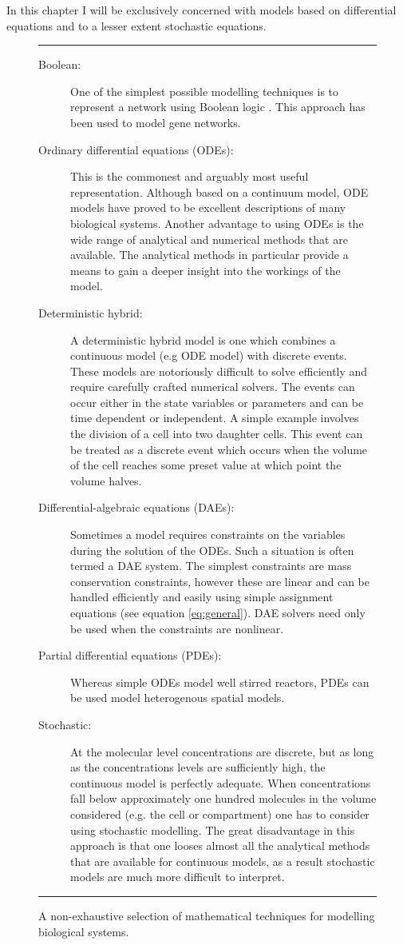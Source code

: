 \documentclass[12pt]{article}
\begin{document}
In this chapter I will be exclusively concerned with models based
on differential equations and to a lesser extent stochastic
equations.

\begin{figure} \label{table:mathTechniques}
\rule[-5pt]{14cm}{1pt}
\begin{description}
\item[Boolean:] One of the simplest possible modelling techniques
is to represent a network using Boolean logic \cite{DeJong2002}.
This approach has been used to model gene networks.
%
\item[Ordinary differential equations (ODEs):] This is the
commonest and arguably most useful representation. Although based on
a continuum model, ODE models have proved to be excellent descriptions
of many biological systems. Another advantage to
using ODEs is the wide range of analytical and numerical methods that are available. The
analytical methods in particular provide a means to gain a deeper
insight into the workings of the model.
%
\item[Deterministic hybrid:] A deterministic hybrid model is one
which combines a continuous model (e.g ODE model) with discrete
events. These models are notoriously difficult to solve efficiently and
require carefully crafted numerical solvers. The events can occur
either in the state variables or parameters and can be
time dependent or independent. A simple example involves the
division of a cell into two daughter cells. This event can be
treated as a discrete event which occurs when the volume of the
cell reaches some preset value at which point the volume halves.
%
\item[Differential-algebraic equations (DAEs):] Sometimes a model
requires constraints on the variables during the solution of the
ODEs. Such a situation is often termed a DAE system. The simplest
constraints are mass conservation constraints, however these are
linear and can be handled efficiently and easily using simple
assignment equations (see equation \ref{eq:general}). DAE solvers need only
 be used when the constraints are nonlinear.
%
\item[Partial differential equations (PDEs):] Whereas simple ODEs
model well stirred reactors, PDEs can be used model heterogenous
spatial models.
%
\item[Stochastic:] At the molecular level concentrations are
discrete, but as long as the concentrations levels are sufficiently high,
the continuous model is perfectly adequate. When concentrations
fall below approximately one hundred molecules in the volume considered (e.g. the cell or compartment) one has to consider using stochastic modelling. The great disadvantage in
this approach is that one looses almost all the analytical methods
that are available for continuous models, as a result stochastic
models are much more difficult to interpret.
\end{description}
\rule[6pt]{14cm}{1pt}
\caption{ A non-exhaustive selection of mathematical techniques for modelling biological systems.}
\end{figure}
\end{document}
